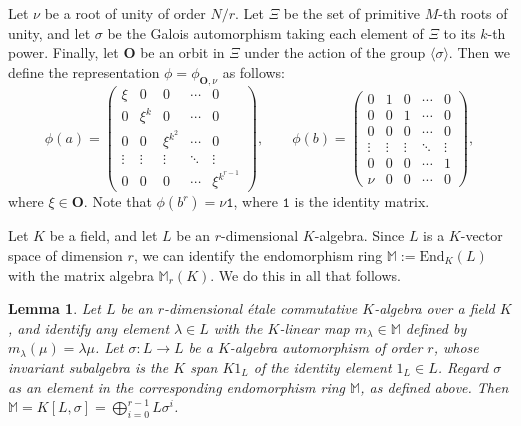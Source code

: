 \documentclass{article}
\newtheorem{lem}[prop]{Lemma}
\theoremstyle{definition}
\begin{document}
Let $\nu$ be a root of unity
of order $N/r$. Let $\Xi$ be the set of primitive 
$M$-th roots of unity, and let $\sigma$ be the Galois
automorphism taking each element of $\Xi$ to its $k$-th
power. Finally, let $\mathbf{O}$ be an orbit in $\Xi$
under the action of the group $\langle\sigma\rangle$.
Then we define the representation
$\phi=\phi_{\mathbf{O},\nu}$ as follows:
\begin{equation}\label{rgen}
\phi(a)=\left(\begin{array}{ccccc}
 \xi & 0 & 0 & \cdots & 0 \\
 0 & \xi^k & 0 & \cdots & 0 \\
 0 & 0 & \xi^{k^2} & \cdots & 0 \\
  \vdots & \vdots & \vdots & \ddots & \vdots \\
  0 & 0 & 0 &\cdots &\xi^{k^{r-1}}
\end{array}\right),
\qquad
\phi(b)=\left(\begin{array}{ccccc}
 0 & 1 & 0 & \cdots & 0 \\
 0 & 0 & 1 & \cdots & 0 \\
 0 & 0 & 0 & \cdots & 0 \\
  \vdots & \vdots & \vdots & \ddots & \vdots \\
  0 & 0 & 0 &\cdots & 1 \\
\nu & 0 & 0 &\cdots & 0
\end{array}\right),
\end{equation}
where $\xi\in\mathbf{O}$. Note that $\phi(b^r)=\nu\mathtt{1}$, 
where $\mathtt{1}$ is the identity matrix.

Let $K$ be a field, and let $L$ be an $r$-dimensional $K$-algebra. 
Since $L$ is a $K$-vector space of dimension $r$, we can identify 
the endomorphism ring $\mathbb{M}:=\mathrm{End}_K(L)$ with the matrix 
algebra $\mathbb{M}_r(K)$. We do this in all that follows.

\begin{lem}\label{l38}
    Let $L$ be an $r$-dimensional \'etale commutative $K$-algebra
    over a field $K$, and identify any element $\lambda\in L$ with 
    the $K$-linear map $m_\lambda\in \mathbb{M}$
    defined by $m_\lambda(\mu)=\lambda\mu$. Let $\sigma:L\rightarrow L$
    be a $K$-algebra automorphism of order $r$, whose invariant subalgebra 
    is the $K$ span $K1_L$ of the identity element $1_L\in L$. 
    Regard $\sigma$ as an element in the corresponding endomorphism 
    ring $\mathbb{M}$, as defined above. Then 
    $\mathbb{M}=K[L,\sigma]=\bigoplus_{i=0}^{r-1}L\sigma^i$.
\end{lem}
\end{document}
